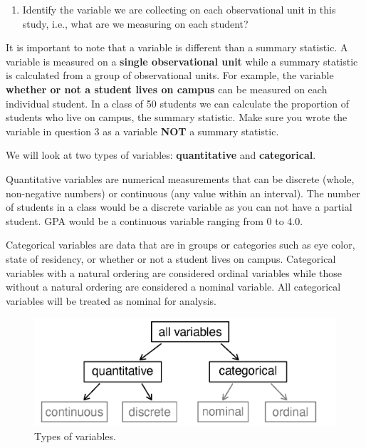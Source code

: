 \documentclass[
]{report}
\providecommand{\tightlist}{%
  \setlength{\itemsep}{0pt}\setlength{\parskip}{0pt}}
\begin{document}
\begin{enumerate}
\def\labelenumi{\arabic{enumi}.}
\setcounter{enumi}{2}
\tightlist
\item
  Identify the variable we are collecting on each observational unit in this study, i.e., what are we measuring on each student?
\end{enumerate}

\vspace{.8in}

It is important to note that a variable is different than a summary statistic. A variable is measured on a \textbf{single observational unit} while a summary statistic is calculated from a group of observational units. For example, the variable \textbf{whether or not a student lives on campus} can be measured on each individual student. In a class of 50 students we can calculate the proportion of students who live on campus, the summary statistic. Make sure you wrote the variable in question 3 as a variable \textbf{NOT} a summary statistic.

\vspace{0.1in}

We will look at two types of variables: \textbf{quantitative} and \textbf{categorical}.

Quantitative variables are numerical measurements that can be discrete (whole, non-negative numbers) or continuous (any value within an interval). The number of students in a class would be a discrete variable as you can not have a partial student. GPA would be a continuous variable ranging from 0 to 4.0.

Categorical variables are data that are in groups or categories such as eye color, state of residency, or whether or not a student lives on campus. Categorical variables with a natural ordering are considered ordinal variables while those without a natural ordering are considered a nominal variable. All categorical variables will be treated as nominal for analysis.

\begin{figure}

{\centering \includegraphics[width=0.75\linewidth]{images/variables} 

}

\caption{Types of variables.}\label{fig:unnamed-chunk-1}
\end{figure}
\end{document}
